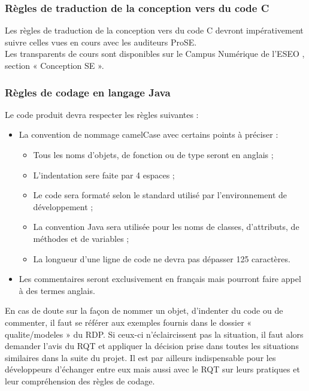 \documentclass[a4paper,11pt,titlepage]{article}
\begin{document}
\subsubsection{Règles de traduction de la conception vers du code C}
Les règles de traduction de la conception vers du code C devront
impérativement suivre celles vues en cours avec les auditeurs ProSE.\\
Les transparents de cours sont disponibles sur le Campus Numérique de l'ESEO
\cite[Campus\_ESEO]{CAMPUS}, section « Conception SE ». \\

\subsubsection{Règles de codage en langage Java}
Le code produit devra respecter les règles suivantes :\\
\begin{itemize}
  \item La convention de nommage camelCase avec certains points à préciser :
        \begin{itemize}
          \item Tous les noms d'objets, de fonction ou de type seront en anglais ;
          \item L'indentation sere faite par 4 espaces ;
          \item Le code sera formaté selon le standard utilisé par l'environnement de développement ;
          \item La convention Java sera utilisée pour les noms de classes, d'attributs, de méthodes et de variables ;
          \item La longueur d'une ligne de code ne devra pas dépasser 125 caractères.
        \end{itemize}
  \item Les commentaires seront exclusivement en français mais pourront faire appel à des termes anglais.
\end{itemize}

En cas de doute sur la façon de nommer un objet, d'indenter du code ou de commenter, il faut se référer aux exemples
fournis dans le dossier « qualite/modeles » du RDP. Si ceux-ci n'éclaircissent pas la situation, il faut alors demander
l'avis du RQT et appliquer la décision prise dans toutes les situations similaires dans la suite du projet. Il est par 
ailleurs indispensable pour les développeurs d'échanger entre eux mais aussi avec le RQT sur leurs pratiques et leur 
compréhension des règles de codage.
\end{document}
